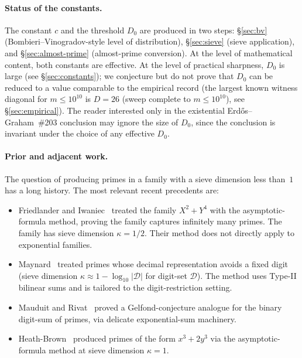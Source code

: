 \paragraph{Status of the constants.}
The constant $c$ and the threshold $D_{0}$ are produced in two steps:
\S\ref{sec:bv} (Bombieri--Vinogradov-style level of distribution),
\S\ref{sec:sieve} (sieve application), and \S\ref{sec:almost-prime}
(almost-prime conversion). At the level of mathematical content, both
constants are effective. At the level of practical sharpness, $D_{0}$
is large (see \S\ref{sec:constants}); we conjecture but do not prove
that $D_{0}$ can be reduced to a value comparable to the empirical
record (the largest known witness diagonal for $m \leq 10^{10}$ is
$D = 26$ (sweep complete to $m \leq 10^{10}$), see \S\ref{sec:empirical}). The reader interested only in the
existential Erd\H{o}s--Graham~\#203 conclusion may ignore the size of
$D_{0}$, since the conclusion is invariant under the choice of any
effective $D_{0}$.

\paragraph{Prior and adjacent work.}
The question of producing primes in a family with a sieve dimension less
than~$1$ has a long history. The most relevant recent precedents are:

\begin{itemize}
  \item Friedlander and Iwaniec~\cite{FriedlanderIwaniec1998} treated
    the family $X^{2} + Y^{4}$ with the asymptotic-formula method,
    proving the family captures infinitely many primes. The family has
    sieve dimension $\kappa = 1/2$. Their method does not directly
    apply to exponential families.
  \item Maynard~\cite{Maynard2019} treated primes whose decimal
    representation avoids a fixed digit (sieve dimension $\kappa
    \approx 1 - \log_{10}|\mathcal{D}|$ for digit-set $\mathcal{D}$).
    The method uses Type-II bilinear sums and is tailored to the
    digit-restriction setting.
  \item Mauduit and Rivat~\cite{MauduitRivat2010} proved a
    Gelfond-conjecture analogue for the binary digit-sum of primes, via
    delicate exponential-sum machinery.
  \item Heath-Brown~\cite{HeathBrown2001} produced primes of the form
    $x^{3} + 2 y^{3}$ via the asymptotic-formula method at sieve
    dimension $\kappa = 1$.
\end{itemize}

